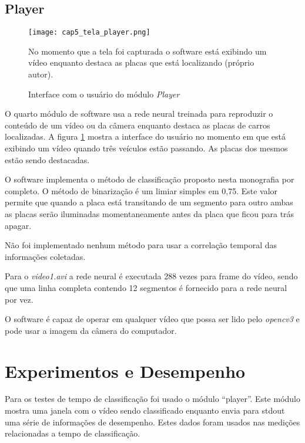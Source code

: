 \subsection{Player}

\begin{figure}[!htb]
	\centering
	\texttt{[image: cap5\_tela\_player.png]}
	\caption{Interface com o usuário do módulo \emph{Player}}
	\label{fig:cap5_tela_player}
	No momento que a tela foi capturada o software está exibindo um vídeo
	enquanto destaca as placas que está localizando (próprio autor).
\end{figure}

O quarto módulo de software usa a rede neural treinada para reproduzir o
conteúdo de um vídeo ou da câmera enquanto destaca as placas de carros
localizadas. A figura \ref{fig:cap5_tela_player} mostra a interface do usuário
no momento em que está exibindo um vídeo quando três veículos estão passando.
As placas dos mesmos estão sendo destacadas.

O software implementa o método de classificação proposto nesta monografia por
completo. O método de binarização é um limiar simples em 0,75. Este valor
permite que quando a placa está transitando de um segmento para outro ambas as
placas serão iluminadas momentaneamente antes da placa que ficou para trás
apagar.

Não foi implementado nenhum método para usar a correlação temporal das
informações coletadas.

Para o \emph{video1.avi} a rede neural é executada 288 vezes para frame do
vídeo, sendo que uma linha completa contendo 12 segmentos é fornecido para a
rede neural por vez.

O software é capaz de operar em qualquer vídeo que possa ser lido pelo
\emph{opencv3} e pode usar a imagem da câmera do computador.

\section{Experimentos e Desempenho}

Para os testes de tempo de classificação foi usado o módulo “player”. Este
módulo mostra uma janela com o vídeo sendo classificado enquanto envia para
stdout uma série de informações de desempenho. Estes dados foram usados nas
medições relacionadas a tempo de classificação.


